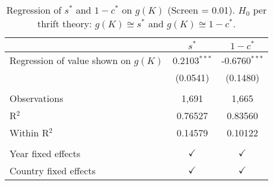 \begin{table}[pos=h]
\caption{Regression of \(s^*\) and \(1-c^*\) on \(g(K)\) (Screen = 0.01). \(H_0\) per thrift theory: \(g(K) \cong s^*\) and \(g(K) \cong 1 - c^*\).}
\centering
\begin{tabularx}{\columnwidth}{lcc}
   \toprule
                                           & $s^*$          & $1-c^*$ \\   
   \midrule 
   Regression of value shown on \(g(K)\)   & 0.2103$^{***}$ & -0.6760$^{***}$\\   
                                           & (0.0541)       & (0.1480)\\   
    \\
   Observations                            & 1,691          & 1,665\\  
   R$^2$                                   & 0.76527        & 0.83560\\  
   Within R$^2$                            & 0.14579        & 0.10122\\  
    \\
   Year fixed effects                      & $\checkmark$   & $\checkmark$\\   
   Country fixed effects                   & $\checkmark$   & $\checkmark$\\   
   \bottomrule
\end{tabularx}
   \label{tbl-4}
\end{table}